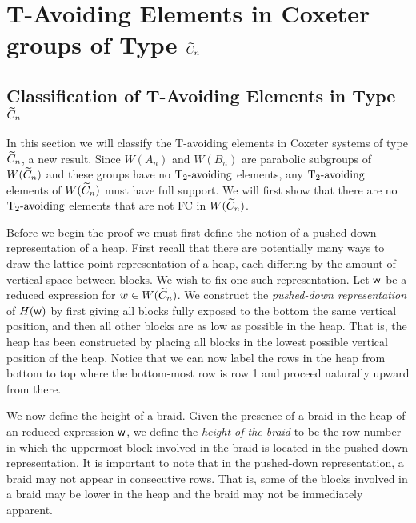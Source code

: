 \chapter{T-Avoiding Elements in Coxeter groups of Type $\widetilde{C}_n$}\label{chap:Cn}



\section{Classification of T-Avoiding Elements in Type $\widetilde{C}_n$}\label{sec:TAC}

In this section we will classify the T-avoiding elements in Coxeter systems of type $\widetilde{C}_n$, a new result. Since $W(A_n)$ and $W(B_n)$ are parabolic subgroups of $W(\widetilde{C}_n)$ and these groups have no $\operatorname{T_2-\mathrm{avoiding}}$ elements,  any $\operatorname{T_2-\mathrm{avoiding}}$ elements of $W(\widetilde{C}_n)$ must have full support. We will first show that there are no $\operatorname{T_2-\mathrm{avoiding}}$ elements that are not FC in $W(\widetilde{C}_n)$.

Before we begin the proof we must first define the notion of a pushed-down representation of a heap. First recall that there are potentially many ways to draw the lattice point representation of a heap, each differing by the amount of vertical space between blocks. We wish to fix one such representation. Let $\mathsf{w}$ be a reduced expression for $w \in W(\widetilde{C}_n)$. We construct the \emph{pushed-down representation} of $H(\mathsf{w})$ by first giving all blocks fully exposed to the bottom the same vertical position, and then all other blocks are as low as possible in the heap. That is, the heap has been constructed by placing all blocks in the lowest possible vertical position of the heap. Notice that we can now label the rows in the heap from bottom to top where the bottom-most row is row 1 and proceed naturally upward from there. 

We now define the height of a braid. Given the presence of a braid in the heap of an reduced expression $\mathsf{w}$, we define the \emph{height of the braid} to be the row number in which the uppermost block involved in the braid is located in the pushed-down representation. It is important to note that in the pushed-down representation, a braid may not appear in consecutive rows. That is, some of the blocks involved in a braid may be lower in the heap and the braid may not be immediately apparent. 

